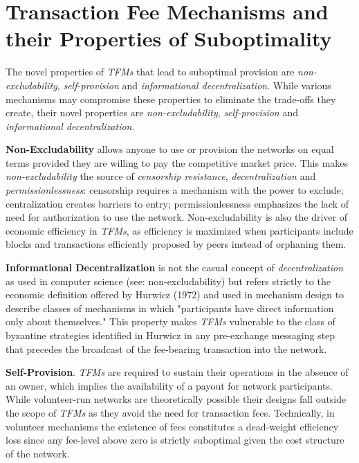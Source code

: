 \documentclass[sigconf,anonymous]{aamas}
\renewcommand{\paragraph}[1]{\smallskip\noindent\textbf{#1}}
\begin{document}
\section{Transaction Fee Mechanisms and their Properties of Suboptimality\label{sec::section1p1}}

The novel properties of \textit{TFMs} that lead to suboptimal provision are \emph{non-excludability}, \emph{self-provision} and \emph{informational decentralization}. While various mechanisms may compromise these properties to eliminate the trade-offs they create, their novel properties are \emph{non-excludability}, \emph{self-provision} and \emph{informational decentralization}.

\paragraph{Non-Excludability} allows anyone to use or provision the networks on equal terms provided they are willing to pay the competitive market price. This makes \textit{non-excludability} the source of \textit{censorship resistance}, \textit{decentralization} and \textit{permissionlessness}: censorship requires a mechanism with the power to exclude; centralization creates barriers to entry; permissionlessness emphasizes the lack of need for authorization to use the network. Non-excludability is also the driver of economic efficiency in \textit{TFMs}, as efficiency is maximized when participants include blocks and transactions efficiently proposed by peers instead of orphaning them.

\paragraph{Informational Decentralization} is not the casual concept of \textit{decentralization} as used in computer science (see: non-excludability) but refers strictly to the economic definition offered by Hurwicz (1972) and used in mechanism design to describe classes of mechanisms in which "participants have direct information only about themselves." This property makes \textit{TFMs} vulnerable to the class of byzantine strategies identified in Hurwicz in any pre-exchange messaging step that precedes the broadcast of the fee-bearing transaction into the network.


\paragraph{Self-Provision}. \textit{TFMs} are required to sustain their operations in the absence of an owner, which implies the availability of a payout for network participants. While volunteer-run networks are theoretically possible their designs fall outside the scope of \textit{TFMs} as they avoid the need for transaction fees. Technically, in volunteer mechanisms the existence of fees constitutes a dead-weight efficiency loss since any fee-level above zero is strictly suboptimal given the cost structure of the network.
\end{document}
